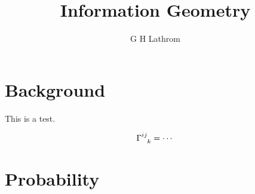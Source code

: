 \documentclass[12pt,letterpaper]{article}
\title{Information Geometry}
\author{G H Lathrom}
\begin{document}
\maketitle



\pagestyle{fancy}
\fancyhf{}
\chead{}
\fancyfoot[C]{\thepage}
\renewcommand{\headrulewidth}{.5pt}

\section{Background}


This is a test.

\cite{pizza}

\begin{equation*}
    \tensor{\Gamma}{^{ij}_{k}} = \cdots
\end{equation*}

\section{Probability}

\cite{wackerly}


\end{document}
